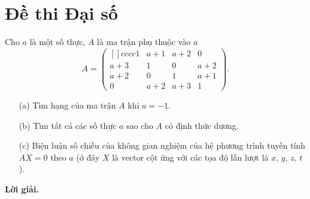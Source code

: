 \newpage
\section{Đề thi Đại số}
\begin{tcolorbox}[title=\textbf{Bài toán B.1 + A.1.}]
    Cho $a$ là một số thực, $A$ là ma trận phụ thuộc vào $a$
    $$A = \begin{pmatrix}[]{cccc}
        1 & a+1 & a+2 & 0 \\
        a+3 & 1 & 0 & a+2 \\
        a+2 & 0 & 1 & a+1 \\
        0 & a+2 & a+3 & 1 
    \end{pmatrix}.$$

    \begin{enumerate}
        \item[(a)] Tìm hạng của ma trận $A$ khi $a = -1$.
        \item[(b)] Tìm tất cả các số thực $a$ sao cho $A$ có định thức dương.
        \item[(c)] Biện luận số chiều của không gian nghiệm của hệ phương trình tuyến tính $AX = 0$ theo $a$ (ở đây $X$ là vector cột ứng với các tọa độ lần lượt là $x,\,y,\,z,\,t$). 
    \end{enumerate}
\end{tcolorbox}

\textbf{Lời giải.}

